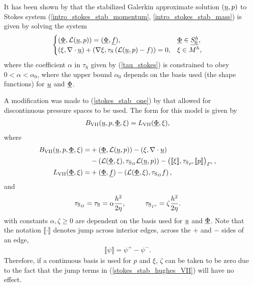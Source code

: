 It has been shown by \citet{hughes_1986} that the stabilized Galerkin approximate solution $(\underline{u}, p)$ to Stokes system (\ref{intro_stokes_stab_momentum}, \ref{intro_stokes_stab_mass}) is given by solving the system
\begin{align}
  \label{stokes_stab_one}
  \begin{cases}
    \left( \underline{\Phi}, \mathcal{L} (\underline{u}, p) \right) = (\underline{\Phi}, \underline{f}), & \underline{\Phi} \in \underline{S_0^h}, \\
    \left( \xi, \nabla \cdot \underline{u} \right) + \left( \nabla \xi, \tau_{\text{S}} \left( \mathcal{L} (\underline{u}, p) - f \right) \right) = 0, & \xi \in M^h, 
  \end{cases}
\end{align}
where the coefficient $\alpha$ in $\tau_{\text{S}}$ given by (\ref{tau_stokes}) is constrained to obey $0 < \alpha < \alpha_0$, where the upper bound $\alpha_0$ depends on the basis used (the shape functions) for $\underline{u}$ and $\underline{\Phi}$.

A modification was made to (\ref{stokes_stab_one}) by \citet{hughes_1987} that allowed for discontinuous pressure spaces to be used.  The form for this model is given by
\begin{align}
  \label{stokes_stab_hughes_VII}
  B_{\text{VII}}(\underline{u},p,\underline{\Phi}, \xi) = L_{\text{VII}}(\underline{\Phi}, \xi),
\end{align}
where
\begin{align}
  \label{stokes_stab_hughes_VII_B}
  B_{\text{VII}}(\underline{u},p,\underline{\Phi}, \xi) = &+ \left( \underline{\Phi}, \mathcal{L} (\underline{u}, p) \right) - \left( \xi, \nabla \cdot \underline{u} \right) \notag \\
  &- \left( \mathcal{L} (\underline{\Phi}, \xi), \tau_{\text{S}_{\varOmega}} \mathcal{L} (\underline{u}, p) \right) - \left( \llbracket \xi \rrbracket, \tau_{\text{S}_{\varGamma'}} \llbracket p \rrbracket \right)_{\varGamma'}, \\
  \label{stokes_stab_hughes_VII_L}
  L_{\text{VII}}(\underline{\Phi}, \xi) = &+ ( \underline{\Phi}, \underline{f} ) - \left( \mathcal{L} (\underline{\Phi}, \xi), \tau_{\text{S}_{\varOmega}} f \right),
\end{align}
and 
\begin{align}
  \label{tau_stokes_VII}
  \tau_{\text{S}_{\Omega}} = \tau_{\text{S}} = \alpha \frac{h^2}{2\eta}, \hspace{10mm}
  \tau_{\text{S}_{\Gamma'}} = \zeta \frac{h^2}{2\eta}.
\end{align}
with constants $\alpha, \zeta \geq 0$ are dependent on the basis used for $\underline{u}$ and $\underline{\Phi}$.  Note that the notation $\llbracket \cdot \rrbracket$ denotes jump across interior edges, \ie across the $+$ and $-$ sides of an edge,
\begin{align*}
  \llbracket \psi \rrbracket = \psi^+ - \psi^-.
\end{align*}
Therefore, if a continuous basis is used for $p$ and $\xi$, $\zeta$ can be taken to be zero due to the fact that the jump terms in (\ref{stokes_stab_hughes_VII}) will have no effect.

